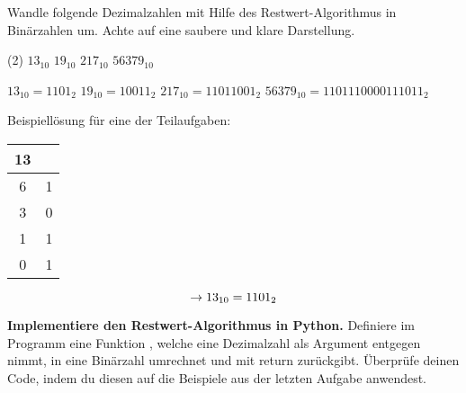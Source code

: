 \begin{question}
	Wandle folgende Dezimalzahlen mit Hilfe des Restwert-Algorithmus in Binärzahlen um. Achte auf eine saubere und klare Darstellung.
 	\begin{tasks}(2)
		\task $\num{13}_{10}$
		\task $\num{19}_{10}$
		\task $\num{217}_{10}$
		\task $\num{56379}_{10}$
	\end{tasks}
\end{question}
\begin{solution}
	\begin{tasks}
		\task $\num{13}_{10} = 1101_2$
		\task $\num{19}_{10} = 10011_2$
		\task $\num{217}_{10} = 11011001_2$
		\task $\num{56379}_{10} = 1101110000111011_2$
	\end{tasks}

	Beispiellösung für eine der Teilaufgaben:
	\begin{table}[H]
		\centering
		\renewcommand{\arraystretch}{1.5}
		\begin{tabular}{|c|c|}
		\hline
		\textbf{13} & \\ \hline
		6 & 1 \\ \hline
		3 & 0 \\ \hline
		1 & 1 \\ \hline
		0 & 1 \\ \hline
		\end{tabular}
	\end{table}
	$$\rightarrow 13_{10} = 1101_2$$

\end{solution}

\newpage

\cprotEnv\begin{question}
	\textbf{Implementiere den Restwert-Algorithmus in Python.} Definiere im Programm eine Funktion , welche eine Dezimalzahl  als Argument entgegen nimmt, in eine Binärzahl umrechnet und mit return zurückgibt. Überprüfe deinen Code, indem du diesen auf die Beispiele aus der letzten Aufgabe anwendest.
\end{question}
\begin{solution}
\end{solution}

\newpage

	


